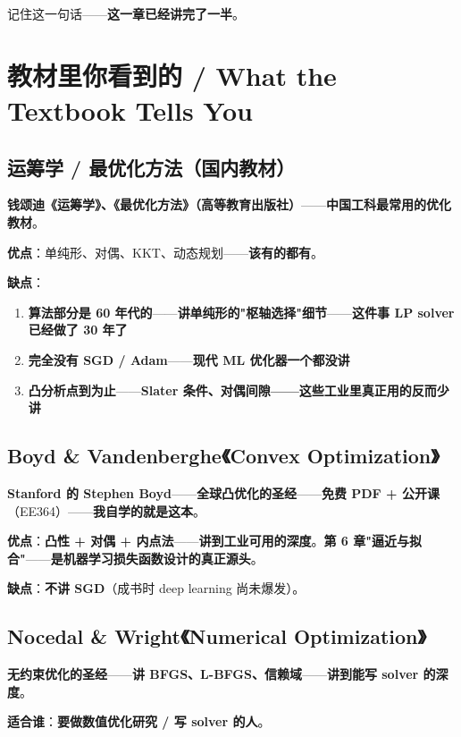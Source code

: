 记住这一句话——\textbf{这一章已经讲完了一半}。

\section{教材里你看到的 / What the Textbook Tells You}

\subsection{运筹学 / 最优化方法（国内教材）}

\textbf{钱颂迪《运筹学》、《最优化方法》（高等教育出版社）}——\textbf{中国工科最常用的优化教材}。

\textbf{优点}：单纯形、对偶、KKT、动态规划——\textbf{该有的都有}。

\textbf{缺点}：

\begin{enumerate}
\item \textbf{算法部分是 60 年代的}——\textbf{讲单纯形的"枢轴选择"细节}——\textbf{这件事 LP solver 已经做了 30 年了}
\item \textbf{完全没有 SGD / Adam}——\textbf{现代 ML 优化器一个都没讲}
\item \textbf{凸分析点到为止}——\textbf{Slater 条件、对偶间隙——这些工业里真正用的反而少讲}
\end{enumerate}

\subsection{Boyd \& Vandenberghe《Convex Optimization》}

\textbf{Stanford 的 Stephen Boyd}——\textbf{全球凸优化的圣经}——\textbf{免费 PDF + 公开课}（EE364）——\textbf{我自学的就是这本}。

\textbf{优点}：\textbf{凸性 + 对偶 + 内点法}——\textbf{讲到工业可用的深度}。\textbf{第 6 章"逼近与拟合"}——\textbf{是机器学习损失函数设计的真正源头}。

\textbf{缺点}：\textbf{不讲 SGD}（成书时 deep learning 尚未爆发）。

\subsection{Nocedal \& Wright《Numerical Optimization》}

\textbf{无约束优化的圣经}——\textbf{讲 BFGS、L-BFGS、信赖域}——\textbf{讲到能写 solver 的深度}。

\textbf{适合谁}：\textbf{要做数值优化研究 / 写 solver 的人}。

